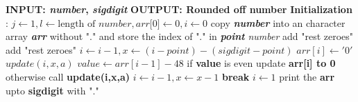 \documentclass[conference]{IEEEtran}
\begin{document}
\begin{algorithmic}[1]
\State \textbf{INPUT: \textit{number}, \textit{sigdigit}}
\State \textbf{OUTPUT: Rounded off number}
\State \textbf{Initialization} :
\State $\textit{j} \gets 1, l \gets \text{length of }\textit{number}, \textit{arr[0]} \gets 0,i \gets 0$
\State copy \textit{\textbf{number}} into an character array \textit{\textbf{arr}} without "." and store the index of "." in \textit{\textbf{point}}
        \Return \textit{number}
        \Return {}
    \Else
        \State {}
        \State add "rest zeroes"
    \EndIf
\Else
        \State {}
        \State {}
        \State add "rest zeroes"
    \Else
            \Return {}
        \Else
            \State $i \gets i-1 , x \gets (i-point)-(sigdigit-point)$
                    \State $arr[i] \gets '0'$
                    \State $update(i,x,a)$
                \Else
                    \State $\textit{value} \gets arr[i-1] - 48$
                    \State if \textbf{value} is even update \textbf{arr[i] to  0} otherwise call \textbf{update(i,x,a)}
                \EndIf
                \State $ i \gets i-1, x \gets x-1$
                    \State \textbf{break}
                \EndIf
            \EndWhile
        \EndIf
            \State $i \gets 1$
                    \State {}
                \EndIf
                \State {}
            \EndWhile
        \Else
                \State {}
            \Else
                \State print the \textbf{arr} upto \textbf{sigdigit} with "."
            \EndIf
        \EndIf
    \EndIf
\EndIf

\end{algorithmic}
\end{document}
